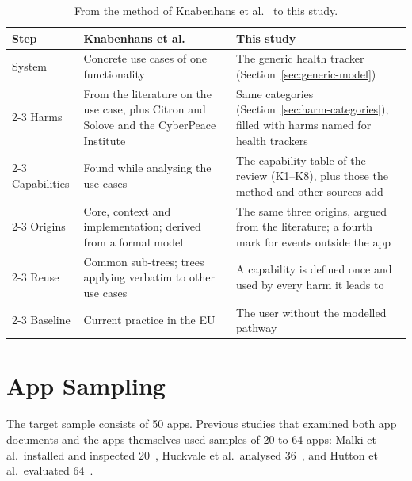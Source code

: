 \begin{table}[H]
\centering
\begin{singlespace}
\caption[From the method of Knabenhans et al.\ to this study]{From the method of
Knabenhans et al.~\parencite[\S4.1--4.3]{knabenhans2026harms} to this study.}
\label{tab:tree-steps}
\footnotesize
\begin{tabularx}{\textwidth}{@{}l>{\raggedright\arraybackslash}p{5.2cm}>{\raggedright\arraybackslash}X@{}}
\toprule
\textbf{Step} & \textbf{Knabenhans et al.} & \textbf{This study} \\
\midrule
System & Concrete use cases of one functionality
  & The generic health tracker (Section~\ref{sec:generic-model}) \\
\cmidrule[0.3pt]{2-3}
Harms & From the literature on the use case, plus Citron and Solove and the CyberPeace Institute
  & Same categories (Section~\ref{sec:harm-categories}), filled with harms named for health trackers \\
\cmidrule[0.3pt]{2-3}
Capabilities & Found while analysing the use cases
  & The capability table of the review (K1--K8), plus those the method and other sources add \\
\cmidrule[0.3pt]{2-3}
Origins & Core, context and implementation; derived from a formal model
  & The same three origins, argued from the literature; a fourth mark for events outside the app \\
\cmidrule[0.3pt]{2-3}
Reuse & Common sub-trees; trees applying verbatim to other use cases
  & A capability is defined once and used by every harm it leads to \\
\cmidrule[0.3pt]{2-3}
Baseline & Current practice in the EU
  & The user without the modelled pathway \\
\bottomrule
\end{tabularx}
\end{singlespace}
\end{table}

\section{App Sampling}
\label{sec:app-sampling}
The target sample consists of 50 apps. Previous studies that examined both
app documents and the apps themselves used samples of 20 to 64 apps:
Malki et al.\ installed and inspected 20~\parencite{malki2024exploring},
Huckvale et al.\ analysed 36~\parencite{huckvale2019assessment}, and
Hutton et al.\ evaluated 64~\parencite{hutton2018assessing}.

